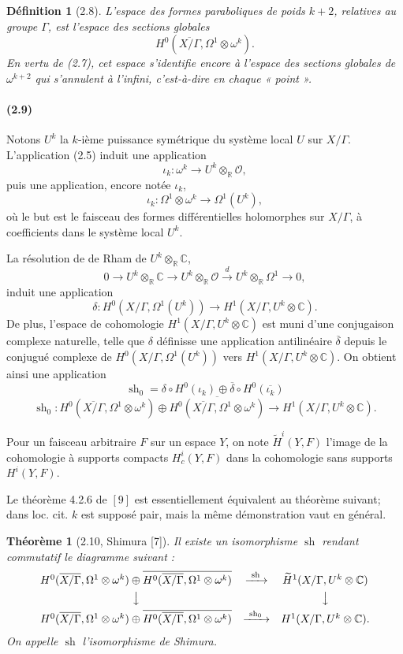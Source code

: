 \documentclass[10pt]{article}
\newcommand{\C}{\mathbb C}
\newcommand{\R}{\mathbb R}
\newcommand{\cO}{\mathcal O}
\newcommand{\sh}{\operatorname{sh}}
\newtheorem*{theorem}{Théorème}
\newtheorem*{definition}{Définition}
\begin{document}
\begin{definition}[2.8]
L'espace des formes paraboliques de poids $k+2$, relatives au groupe $\Gamma$, est l'espace
des sections globales
\[
H^0(\overline{X/\Gamma},\Omega^1\otimes\omega^k).
\]
En vertu de (2.7), cet espace s'identifie encore à l'espace des sections globales de
$\omega^{k+2}$ qui s'annulent à l'infini, c'est-à-dire en chaque « point ».
\end{definition}

\paragraph{(2.9)}
Notons $U^k$ la $k$-ième puissance symétrique du système local $U$ sur $X/\Gamma$.
L'application (2.5) induit une application
\[
\iota_k:\omega^k\to U^k\otimes_\R\cO,
\]
puis une application, encore notée $\iota_k$,
\[
\iota_k:\Omega^1\otimes\omega^k\to \Omega^1(U^k),
\]
où le but est le faisceau des formes différentielles holomorphes sur $X/\Gamma$, à
coefficients dans le système local $U^k$.

La résolution de de Rham de $U^k\otimes_\R\C$,
\[
0\to U^k\otimes_\R\C\to U^k\otimes_\R\cO
\xrightarrow{d}U^k\otimes_\R\Omega^1\to 0,
\]
induit une application
\[
\delta:H^0(X/\Gamma,\Omega^1(U^k))\to H^1(X/\Gamma,U^k\otimes\C).
\]
De plus, l'espace de cohomologie $H^1(X/\Gamma,U^k\otimes\C)$ est muni d'une
conjugaison complexe naturelle, telle que $\delta$ définisse une application antilinéaire
$\overline{\delta}$ depuis le conjugué complexe de $H^0(X/\Gamma,\Omega^1(U^k))$ vers
$H^1(X/\Gamma,U^k\otimes\C)$. On obtient ainsi une application
\[
\sh_0=\delta\circ H^0(\iota_k)\oplus
\overline{\delta}\circ H^0(\overline{\iota_k})
\]
\[
\sh_0:
H^0(\overline{X/\Gamma},\Omega^1\otimes\omega^k)
\oplus
\overline{H^0(\overline{X/\Gamma},\Omega^1\otimes\omega^k)}
\longrightarrow
H^1(X/\Gamma,U^k\otimes\C).
\]

Pour un faisceau arbitraire $F$ sur un espace $Y$, on note $\widetilde H^i(Y,F)$ l'image
de la cohomologie à supports compacts $H^i_c(Y,F)$ dans la cohomologie sans supports
$H^i(Y,F)$.

Le théorème 4.2.6 de \([9]\) est essentiellement équivalent au théorème suivant; dans
loc. cit. $k$ est supposé pair, mais la même démonstration vaut en général.

\begin{theorem}[2.10, Shimura {\rm [7]}]
Il existe un isomorphisme $\sh$ rendant commutatif le diagramme suivant :
\[
\begin{array}{ccc}
H^0(\overline{X/\Gamma},\Omega^1\otimes\omega^k)\oplus
\overline{H^0(\overline{X/\Gamma},\Omega^1\otimes\omega^k)}
& \xrightarrow{\ \sh\ } &
\widetilde H^1(X/\Gamma,U^k\otimes\C)
\\[0.4em]
\big\downarrow && \big\downarrow
\\[0.4em]
H^0(\overline{X/\Gamma},\Omega^1\otimes\omega^k)\oplus
\overline{H^0(\overline{X/\Gamma},\Omega^1\otimes\omega^k)}
& \xrightarrow{\ \sh_0\ } &
H^1(X/\Gamma,U^k\otimes\C).
\end{array}
\]
On appelle $\sh$ l'isomorphisme de Shimura.
\end{theorem}
\end{document}
